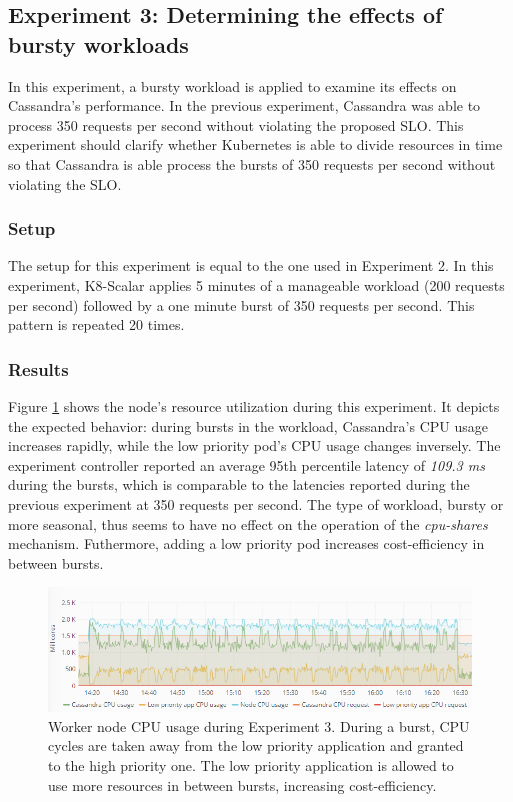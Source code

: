 \subsection{Experiment 3: Determining the effects of bursty workloads}
In this experiment, a bursty workload is applied to examine its effects on Cassandra's performance. In the previous experiment, Cassandra was able to process 350 requests per second without violating the proposed SLO. This experiment should clarify whether Kubernetes is able to divide resources in time so that Cassandra is able process the bursts of 350 requests per second without violating the SLO.

\subsubsection{Setup}
The setup for this experiment is equal to the one used in Experiment 2. In this experiment, K8-Scalar applies 5 minutes of a manageable workload (200 requests per second) followed by a one minute burst of 350 requests per second. This pattern is repeated 20 times.  

\subsubsection{Results}
Figure \ref{fig:cpu-cas-lpp-bursty} shows the node's resource utilization during this experiment. It depicts the expected behavior: during bursts in the workload, Cassandra's CPU usage increases rapidly, while the low priority pod's CPU usage changes inversely. The experiment controller reported an average 95th percentile latency of \textit{109.3 ms} during the bursts, which is comparable to the latencies reported during the previous experiment at 350 requests per second. The type of workload, bursty or more seasonal, thus seems to have no effect on the operation of the \textit{cpu-shares} mechanism. Futhermore, adding a low priority pod increases cost-efficiency in between bursts.

\begin{figure}
\centering
\includegraphics[width=\columnwidth]{Images/Experiments/CPU/Grafana/cpu-cas-lpp-bursty.PNG}
\caption{Worker node CPU usage during Experiment 3. During a burst, CPU cycles are taken away from the low priority application and granted to the high priority one. The low priority application is allowed to use more resources in between bursts, increasing cost-efficiency.}
\label{fig:cpu-cas-lpp-bursty}
\end{figure}

